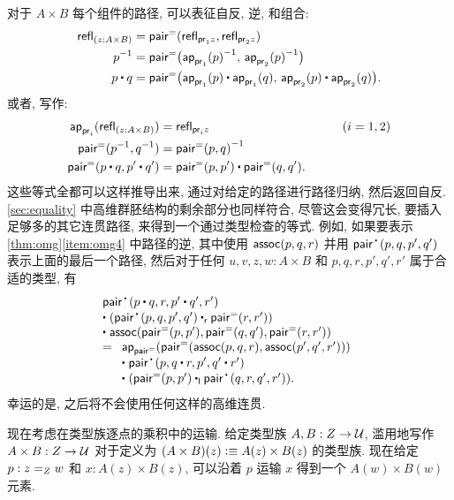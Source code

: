 对于 $A\times B$ 每个组件的路径, 可以表征自反, 逆, 和组合:
\begin{align*}
{\refl{(z : A \times B)}}
    &= {\pairpath (\refl{\proj{1} z},\refl{\proj{2} z})} \\
    {\opp{p}}
    &= {\pairpath \big(\opp{\projpath{1} (p)},\, \opp{\projpath{2} (p)}\big)} \\
    {{p \ct q}}
    &= {\pairpath \big({\projpath{1} (p)} \ct {\projpath{1} (q)},\,{\projpath{2} (p)} \ct {\projpath{2} (q)}\big)}.
\end{align*}
或者, 写作:
\begin{alignat*}{2}
    \projpath{i}(\refl{(z : A \times B)}) &= \refl{\proj{i} z} &\qquad (i=1,2)\\
    \pairpath(\opp p, \opp q) &= \opp{\pairpath(p,q)}\\
    \pairpath(p\ct q, p'\ct q') &= \pairpath(p,p') \ct \pairpath(q,q').
\end{alignat*}
这些等式全都可以这样推导出来, 通过对给定的路径进行路径归纳, 然后返回自反.
\cref{sec:equality} 中高维群胚结构的剩余部分也同样符合, 尽管这会变得冗长, 要插入足够多的其它连贯路径, 来得到一个通过类型检查的等式.
例如, 如果要表示 \cref{thm:omg}\ref{item:omg4} 中路径的逆, 其中使用 $\ctassoc(p,q,r)$ 并用 $\pairct(p,q,p',q')$ 表示上面的最后一个路径, 然后对于任何 $u,v,z,w:A\times B$ 和 $p,q,r,p',q',r'$ 属于合适的类型, 有
\begin{equation*}
    \begin{array}{l}
        \pairct(p\ct q, r, p'\ct q', r')                                    \\
        \ct\;  (\pairct(p,q,p',q') \rightwhisker \pairpath(r,r'))             \\
        \ct\;  \ctassoc(\pairpath(p,p'),\pairpath(q,q'),\pairpath(r,r'))      \\
        =
        \begin{array}[t]{l}
            \apfunc{\pairpath}({\pairpath(\ctassoc(p,q,r),\ctassoc(p',q',r'))}) \\
            \ct\; \pairct(p, q\ct r, p', q'\ct r')                              \\
            \ct\; (\pairpath(p,p') \leftwhisker \pairct(q,r,q',r')).
        \end{array}
    \end{array}
\end{equation*}
幸运的是, 之后将不会使用任何这样的高维连贯.

%
现在考虑在类型族逐点的乘积中的运输.
给定类型族 $ A, B : Z \to \type$, 滥用地写作 $A\times B:Z\to \type$ 对于定义为 $(A\times B)(z) \defeq A(z) \times B(z)$ 的类型族.
现在给定 $p : \id[Z]{z}{w}$ 和 $x : A(z) \times B(z)$, 可以沿着 $p$ 运输 $x$ 得到一个 $A(w)\times B(w)$ 元素.


